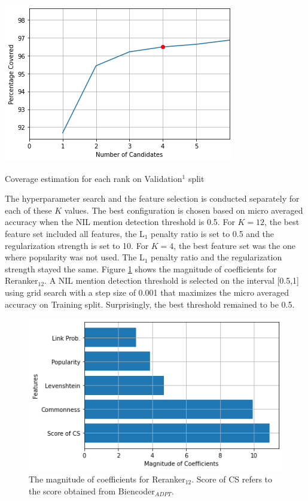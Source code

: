 \documentclass{report}
\theoremstyle{definition}
\theoremstyle{remark}
\begin{document}
\begin{table}
\begin{minipage}{0.5\linewidth}
		\includegraphics[scale=0.5]{candplotzoom.png}
	\end{minipage}
	\caption{Coverage estimation for each rank on Validation$^1$ split}
	\label{tab:coverageestimation}
\end{table}

The hyperparameter search and the feature selection is conducted separately for each of these $K$ values. The best configuration is chosen based on micro averaged accuracy when the NIL mention detection threshold is 0.5. For $K=12$, the best feature set included all features, the L$_1$ penalty ratio is set to 0.5 and the regularization strength is set to 10. For $K=4$, the best feature set was the one where popularity was not used. The L$_1$ penalty ratio and the regularization strength stayed the same. Figure \ref{fig:rerankercoef} shows the magnitude of coefficients for Reranker$_{12}$. A NIL mention detection threshold is selected on the interval [0.5,1] using grid search with a step size of 0.001 that maximizes the micro averaged accuracy on Training split. Surprisingly, the best threshold remained to be 0.5.

\begin{figure}
    \centering
    \includegraphics[scale=0.5]{rerankercoef.png}
    \caption{The magnitude of coefficients for Reranker$_{12}$. Score of CS refers to the score obtained from Biencoder$_{ADPT}$.}
    \label{fig:rerankercoef}
\end{figure}
\end{document}
